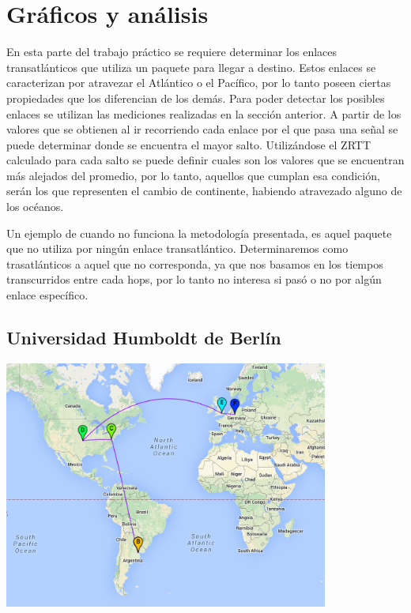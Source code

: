 \section{Gráficos y análisis}

En esta parte del trabajo práctico se requiere determinar los enlaces transatlánticos que utiliza un paquete para llegar a destino. Estos enlaces se caracterizan por atravezar el Atlántico o el Pacífico, por lo tanto poseen ciertas propiedades que los diferencian de los demás. Para poder detectar los posibles enlaces se utilizan las mediciones realizadas en la sección anterior. A partir de los valores que se obtienen al ir recorriendo cada enlace por el que pasa una señal se puede determinar donde se encuentra el mayor salto.
Utilizándose el ZRTT calculado para cada salto se puede definir cuales son los valores que se encuentran más alejados del promedio, por lo tanto, aquellos que cumplan esa condición, serán los que representen el cambio de continente, habiendo atravezado alguno de los océanos.

Un ejemplo de cuando no funciona la metodología presentada, es aquel paquete que no utiliza por ningún enlace transatlántico. Determinaremos como trasatlánticos a aquel que no corresponda, ya que nos basamos en los tiempos transcurridos entre cada hops, por lo tanto no interesa si pasó o no por algún enlace específico.

\subsection{Universidad Humboldt de Berlín}
\centerline{\includegraphics[width=0.8\textwidth]{mapas/Alemania.jpeg}}

